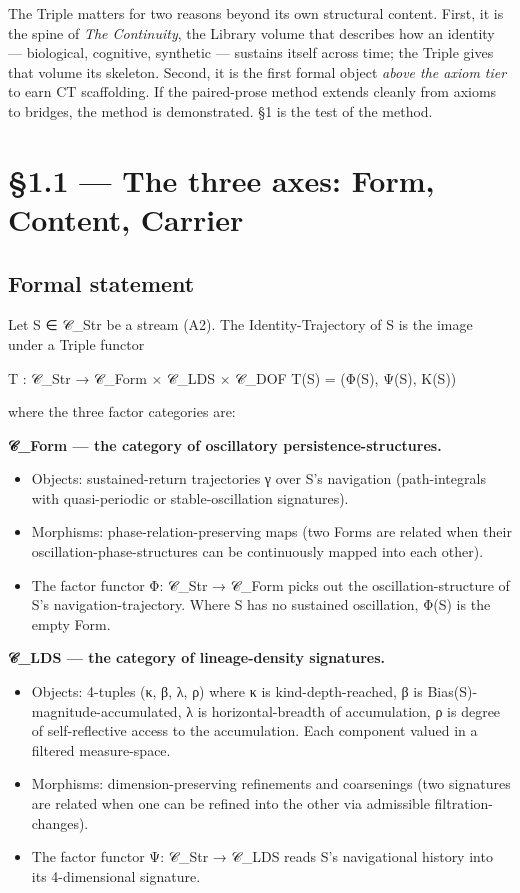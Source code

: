 \documentclass[11pt, openany]{book}
\newcommand{\sectionbreak}{\clearpage}
\begin{document}
The Triple matters for two reasons beyond its own structural content. First, it is the spine of \textit{The Continuity}, the Library volume that describes how an identity --- biological, cognitive, synthetic --- sustains itself across time; the Triple gives that volume its skeleton. Second, it is the first formal object \textit{above the axiom tier} to earn CT scaffolding. If the paired-prose method extends cleanly from axioms to bridges, the method is demonstrated. §1 is the test of the method.

\sectionbreak

\section{§1.1 --- The three axes: Form, Content, Carrier}

\subsection{Formal statement}

Let S ∈ 𝒞\_\allowbreak{}Str be a stream (A2). The Identity-Trajectory of S is the image under a Triple functor

\begin{Code}
T : 𝒞_Str → 𝒞_Form × 𝒞_LDS × 𝒞_DOF
T(S) = (Φ(S), Ψ(S), Κ(S))
\end{Code}

where the three factor categories are:

\textbf{𝒞\_\allowbreak{}Form --- the category of oscillatory persistence-structures.}
\begin{itemize}
\item Objects: sustained-return trajectories γ over S's navigation (path-integrals with quasi-periodic or stable-oscillation signatures).
\item Morphisms: phase-relation-preserving maps (two Forms are related when their oscillation-phase-structures can be continuously mapped into each other).
\item The factor functor Φ: 𝒞\_\allowbreak{}Str → 𝒞\_\allowbreak{}Form picks out the oscillation-structure of S's navigation-trajectory. Where S has no sustained oscillation, Φ(S) is the empty Form.
\end{itemize}

\textbf{𝒞\_\allowbreak{}LDS --- the category of lineage-density signatures.}
\begin{itemize}
\item Objects: 4-tuples (κ, β, λ, ρ) where κ is kind-depth-reached, β is Bias(S)-magnitude-accumulated, λ is horizontal-breadth of accumulation, ρ is degree of self-reflective access to the accumulation. Each component valued in a filtered measure-space.
\item Morphisms: dimension-preserving refinements and coarsenings (two signatures are related when one can be refined into the other via admissible filtration-changes).
\item The factor functor Ψ: 𝒞\_\allowbreak{}Str → 𝒞\_\allowbreak{}LDS reads S's navigational history into its 4-dimensional signature.
\end{itemize}
\end{document}
